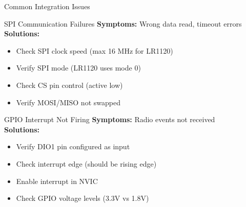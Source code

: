 \documentclass{beamer}
\begin{document}
\begin{frame}{Common Integration Issues}
\begin{block}{SPI Communication Failures}
\textbf{Symptoms:} Wrong data read, timeout errors\\
\textbf{Solutions:}
\begin{itemize}
    \item Check SPI clock speed (max 16 MHz for LR1120)
    \item Verify SPI mode (LR1120 uses mode 0)
    \item Check CS pin control (active low)
    \item Verify MOSI/MISO not swapped
\end{itemize}
\end{block}

\begin{block}{GPIO Interrupt Not Firing}
\textbf{Symptoms:} Radio events not received\\
\textbf{Solutions:}
\begin{itemize}
    \item Verify DIO1 pin configured as input
    \item Check interrupt edge (should be rising edge)
    \item Enable interrupt in NVIC
    \item Check GPIO voltage levels (3.3V vs 1.8V)
\end{itemize}
\end{block}
\end{frame}
\end{document}
